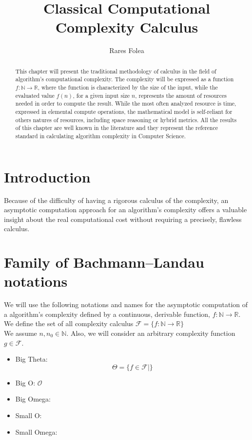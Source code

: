 \documentclass{article}
\title{Classical Computational Complexity Calculus }
\author{Rares Folea}
\begin{document}
\maketitle
\begin{abstract}
This chapter will present the traditional methodology of calculus in the field of algorithm's computational complexity. The complexity will be expressed as a function $f:\mathbb{N}\longrightarrow\mathbb{R}$, where the function is characterized by the size of the input, while the evaluated value $f(n)$, for a given input size $n$, represents the amount of resources needed in order to compute the result. While the most often analyzed resource is time, expressed in elemental compute operations, the mathematical model is self-reliant for others natures of resources, including space reasoning or hybrid metrics. All the results of this chapter are well known in the literature and they represent the reference standard in calculating algorithm complexity in Computer Science. 
\end{abstract}
\tableofcontents




\section{Introduction}
Because of the difficulty of having a rigorous calculus of the complexity, an asymptotic computation approach for an algorithm's complexity offers a valuable insight about the real computational cost without requiring a precisely, flawless calculus.



\section{Family of Bachmann–Landau notations}
We will use the following notations and names for the asymptotic computation of a algorithm's complexity defined by a continuous, derivable function, $f:\mathbb{N}\longrightarrow\mathbb{R}$. \\
We define the set of all complexity calculus $\mathcal{F}= \lbrace f:\mathbb{N}\longrightarrow\mathbb{R} \rbrace$
\\We assume $n, n_{0}\in\mathbb{N}$. Also, we will consider an arbitrary complexity function $g \in \mathcal{F}$. 
\begin{itemize}
  \item Big Theta: \[\Theta= \lbrace f \in \mathcal{F} | \rbrace\]
  \item Big O: $\mathcal{O}$
  \item Big Omega:
  \item Small O:
  \item Small Omega:
\end{itemize}
\end{document}
